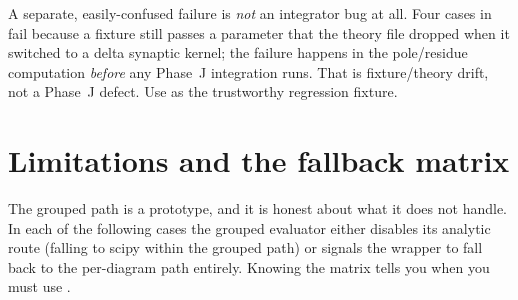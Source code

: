 \begin{note}
A separate, easily-confused failure is \emph{not} an integrator bug at all. Four
 cases in  fail
because a fixture still passes a  parameter that the theory file
dropped when it switched to a delta synaptic kernel; the failure happens in the
pole/residue computation \emph{before} any Phase~J integration runs. That is
fixture/theory drift, not a Phase~J defect. Use  as the
trustworthy regression fixture.
\end{note}

\section{Limitations and the fallback matrix}

The grouped path is a prototype, and it is honest about what it does not handle.
In each of the following cases the grouped evaluator either disables its analytic
route (falling to scipy within the grouped path) or signals the wrapper to fall
back to the per-diagram path entirely. Knowing the matrix tells you when you must
use .

